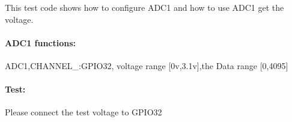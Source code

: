 This test code shows how to configure A\+D\+C1 and how to use A\+D\+C1 get the voltage.

\paragraph*{A\+D\+C1 functions\+:}


\begin{DoxyItemize}
\item A\+D\+C1,C\+H\+A\+N\+N\+E\+L\+\_\+:G\+P\+I\+O32, voltage range \mbox{[}0v,3.\+1v\mbox{]},the Data range \mbox{[}0,4095\mbox{]}
\end{DoxyItemize}

\paragraph*{Test\+:}


\begin{DoxyItemize}
\item Please connect the test voltage to G\+P\+I\+O32 
\end{DoxyItemize}